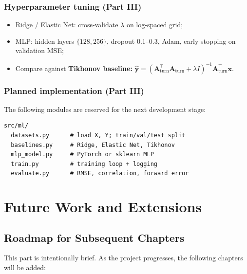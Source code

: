 \documentclass[11pt,a4paper]{report}
\newcommand{\mathbfy}{\mathbf{y}}
\newcommand{\mathbfx}{\mathbf{x}}
\newcommand{\Aturn}{\mathbf{A}_{\mathrm{turn}}}
\begin{document}
\section{Hyperparameter tuning (Part III)}

\begin{itemize}[noitemsep]
    \item Ridge / Elastic Net: cross-validate $\lambda$ on log-spaced grid;
    \item MLP: hidden layers $\{128,256\}$, dropout 0.1--0.3, Adam, early stopping on validation MSE;
    \item Compare against \textbf{Tikhonov baseline:} $\hat{\mathbfy}=(\Aturn^\top\Aturn+\lambda I)^{-1}\Aturn^\top\mathbfx$.
\end{itemize}

\section{Planned implementation (Part III)}

The following modules are reserved for the next development stage:
\begin{verbatim}
src/ml/
  datasets.py      # load X, Y; train/val/test split
  baselines.py     # Ridge, Elastic Net, Tikhonov
  mlp_model.py     # PyTorch or sklearn MLP
  train.py         # training loop + logging
  evaluate.py      # RMSE, correlation, forward error
\end{verbatim}


\part{Future Work and Extensions}
\label{part:future}

\chapter{Roadmap for Subsequent Chapters}
\label{ch:future}

This part is intentionally brief. As the project progresses, the following chapters will be added:
\end{document}
